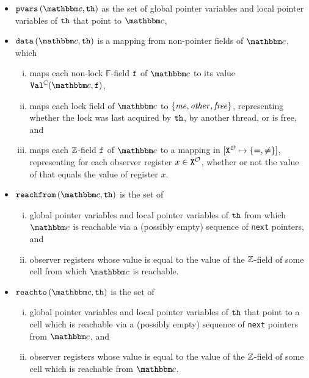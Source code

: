 \begin{itemize}
\item
  $\pvarsofth{\cell}{\thread}$ as the set of global pointer variables and
  local pointer variables of ${\tt th}$ that point to $\cell$,
\item
  $\valsofth{\cell}{\thread}$ is a mapping from non-pointer fields of $\cell$, which
  \begin{enumerate}[(i)]
    \item
    maps each non-lock $\mathbb{F}$-field $\mathtt{f}$ of $\cell$ to its value
    $\cellval(\cell,\field)$,
  \item
    maps each  lock field of $\cell$
    to $\left\{\mathit{me},\mathit{other},\mathit{free}\right\}$,
  representing whether the lock was last acquired by ${\tt th}$, by
  another thread, or is free,
  and
\item
  maps each ${\mathbb Z}$-field $\mathtt{f}$ of $\cell$ to a mapping in
  $[{\tt X}^{{\mathcal O}} \mapsto{\left\{=,\neq\right\}}]$, representing for
  each observer register $x  \in {\tt X}^{{\mathcal O}}$, whether or not the value
  of that equals the value of register $x$.
  \end{enumerate}
\item
  $\reachfromofth{\cell}{\thread}$ is the set of
  \begin{enumerate}[(i)]
  \item global pointer variables and local pointer variables of ${\tt th}$
    from which $\cell$ is reachable via a (possibly empty)
  sequence of {\tt next} pointers, and
\item observer registers whose value is equal to the value of the ${\mathbb Z}$-field of some cell from which $\cell$ is reachable.
   
  \end{enumerate}
\item
  $\reachtoofth{\cell}{\thread}$ is the set of
  \begin{enumerate}[(i)]
  \item global pointer variables and local pointer variables of ${\tt th}$
    that point to a cell which is reachable via a (possibly empty)
  sequence of {\tt next} pointers from $\cell$, and
  \item observer registers whose value is equal to the value of the ${\mathbb Z}$-field of some cell which is reachable from $\cell$.
  \end{enumerate}
\end{itemize}
